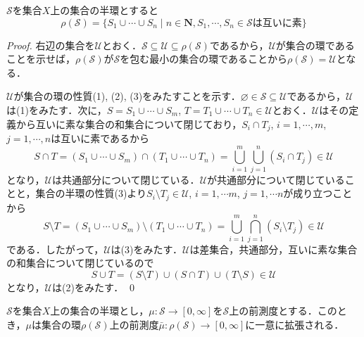 \documentclass[12pt,a4paper]{jsarticle}
\begin{document}
\begin{proposition}
    $\mathcal{S}$を集合$X$上の集合の半環とすると
    \begin{equation*}
        \rho(\mathcal{S}) = \{S_1 \cup \cdots \cup S_n \mid n \in \bm{N}, S_1, \cdots, S_n \in \mathcal{S}\text{は互いに素}\}
    \end{equation*}
\end{proposition}
\begin{proof}
    右辺の集合を$\mathcal{U}$とおく．$\mathcal{S} \subseteq \mathcal{U} \subseteq \rho(\mathcal{S})$であるから，$\mathcal{U}$が集合の環であることを示せば，$\rho(\mathcal{S})$が$\mathcal{S}$を包む最小の集合の環であることから$\rho(\mathcal{S}) = \mathcal{U}$となる．

    $\mathcal{U}$が集合の環の性質(1), (2), (3)をみたすことを示す．$\varnothing \in \mathcal{S} \subseteq \mathcal{U}$であるから，$\mathcal{U}$は(1)をみたす．次に，$S = S_1 \cup \cdots \cup S_m$, $T = T_1 \cup \cdots \cup T_n \in \mathcal{U}$とおく．$\mathcal{U}$はその定義から互いに素な集合の和集合について閉じており，$S_i \cap T_j$, $i = 1, \cdots, m$, $j = 1, \cdots, n$は互いに素であるから
    \begin{equation*}
        S \cap T = (S_1 \cup \cdots \cup S_m) \cap (T_1 \cup \cdots \cup T_n) = \bigcup_{i = 1}^m \bigcup_{j = 1}^n (S_i \cap T_j) \in \mathcal{U}
    \end{equation*}
    となり，$\mathcal{U}$は共通部分について閉じている．$\mathcal{U}$が共通部分について閉じていることと，集合の半環の性質(3)より$S_i \setminus T_j \in \mathcal{U}$, $i = 1, \cdots m$, $j = 1, \cdots n$が成り立つことから
    \begin{equation*}
        S \setminus T = (S_1 \cup \cdots \cup S_m) \setminus (T_1 \cup \cdots \cup T_n) = \bigcup_{i = 1}^m \bigcap_{j = 1}^n (S_i \setminus T_j) \in \mathcal{U}
    \end{equation*}
    である．したがって，$\mathcal{U}$は(3)をみたす．$\mathcal{U}$は差集合，共通部分，互いに素な集合の和集合について閉じているので
    \begin{equation*}
        S \cup T = (S \setminus T) \cup (S \cap T) \cup (T \setminus S) \in \mathcal{U}
    \end{equation*}
    となり，$\mathcal{U}$は(2)をみたす．
    \qed
\end{proof}

\begin{proposition}
    $\mathcal{S}$を集合$X$上の集合の半環とし，$\mu:\mathcal{S} \to [0, \infty]$を$\mathcal{S}$上の前測度とする．このとき，$\mu$は集合の環$\rho(\mathcal{S})$上の前測度$\bar{\mu}:\rho(\mathcal{S}) \to [0, \infty]$に一意に拡張される．
\end{proposition}
\end{document}
